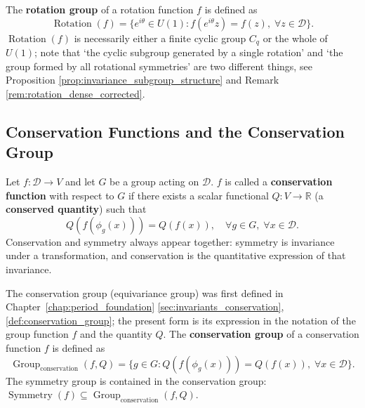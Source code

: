 \begin{definition}\label{def:rotation_group_gf}
The \textbf{rotation group} of a rotation function $f$ is defined as
\[
\operatorname{Rotation}(f) = \{e^{i\theta} \in U(1) : f(e^{i\theta}z) = f(z),\; \forall z \in \mathcal{D}\}.
\]
$\operatorname{Rotation}(f)$ is necessarily either a finite cyclic group $C_q$ or the whole of $U(1)$; note that `the cyclic subgroup generated by a single rotation' and `the group formed by all rotational symmetries' are two different things, see Proposition \ref{prop:invariance_subgroup_structure} and Remark \ref{rem:rotation_dense_corrected}.
\end{definition}

\subsection{\texorpdfstring{Conservation Functions and the Conservation Group}{Conservation Functions and the Conservation Group}}

\begin{definition}\label{def:conservation_function_gf}
Let $f: \mathcal{D} \to V$ and let $G$ be a group acting on $\mathcal{D}$. $f$ is called a \textbf{conservation function} with respect to $G$ if there exists a scalar functional $Q: V \to \mathbb{R}$ (a \textbf{conserved quantity}) such that
\[
Q(f(\phi_g(x))) = Q(f(x)), \quad \forall g \in G,\; \forall x \in \mathcal{D}.
\]
Conservation and symmetry always appear together: symmetry is invariance under a transformation, and conservation is the quantitative expression of that invariance.
\end{definition}

\begin{definition}\label{def:conservation_group_gf}
The conservation group (equivariance group) was first defined in Chapter~\ref{chap:period_foundation} \cref{sec:invariants_conservation}, \cref{def:conservation_group}; the present form is its expression in the notation of the group function $f$ and the quantity $Q$.
The \textbf{conservation group} of a conservation function $f$ is defined as
\[
\operatorname{Group}_{\mathrm{conservation}}(f, Q) = \{g \in G : Q(f(\phi_g(x))) = Q(f(x)),\; \forall x \in \mathcal{D}\}.
\]
The symmetry group is contained in the conservation group: $\operatorname{Symmetry}(f) \subseteq \operatorname{Group}_{\mathrm{conservation}}(f, Q)$.
\end{definition}

